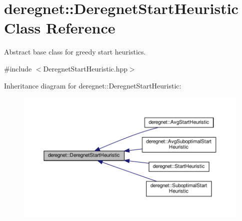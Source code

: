 \hypertarget{classderegnet_1_1DeregnetStartHeuristic}{}\section{deregnet\+:\+:Deregnet\+Start\+Heuristic Class Reference}
\label{classderegnet_1_1DeregnetStartHeuristic}


Abstract base class for greedy start heuristics.  




{\ttfamily \#include $<$Deregnet\+Start\+Heuristic.\+hpp$>$}



Inheritance diagram for deregnet\+:\+:Deregnet\+Start\+Heuristic\+:\nopagebreak
\begin{figure}[H]
\begin{center}
\leavevmode
\includegraphics[width=350pt]{classderegnet_1_1DeregnetStartHeuristic__inherit__graph}
\end{center}
\end{figure}
